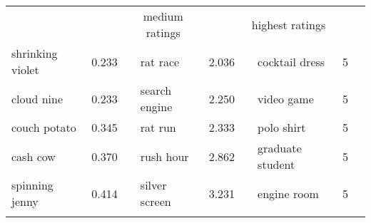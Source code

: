 \begin{table}[!htb]
  \centering
\footnotesize
\begin{tabular}{@{}lcclcclcc@{}}\lsptoprule
\multicolumn{2}{c}{lowest ratings}&\phantom{abc}&\multicolumn{2}{c}{medium ratings}&\phantom{abc}&\multicolumn{2}{c}{highest ratings}\\
\cmidrule{1-2}\cmidrule{4-5}\cmidrule{7-8}
shrinking violet&   0.233&&       rat race &  2.036&&   cocktail dress &         5\\
      cloud nine&   0.233&&  search engine &  2.250&&       video game &         5\\
    couch potato&   0.345&&        rat run &  2.333&&       polo shirt &         5\\
        cash cow&   0.370&&      rush hour &  2.862&& graduate student &         5\\
  spinning jenny&   0.414&&  silver screen &  3.231&&      engine room  &        5\\
      \lspbottomrule  
\end{tabular}

\end{table}
